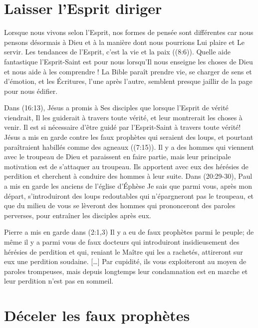 \section{Laisser l'Esprit diriger}

Lorsque nous vivons selon l'Esprit, nos formes de pensée sont différentes
 car nous pensons désormais à Dieu et à la manière dont nous pourrions
 Lui plaire et Le servir.
 Les tendances de l'Esprit, c'est la vie et la paix ((8:6)).
 Quelle aide fantastique l'Esprit-Saint est pour nous lorsqu'Il nous enseigne
 les choses de Dieu et nous aide à les comprendre !
 La Bible paraît prendre vie, se charger de sens et d'émotion,
 et les Écritures, l'une après l'autre, semblent presque jaillir
 de la page pour nous édifier.

Dans (16:13), Jésus a promis à Ses disciples
 que lorsque l'Esprit de vérité viendrait,
 Il les guiderait à travers toute vérité,
 et leur montrerait les choses à venir.
 Il est si nécessaire d'être guidé par l'Esprit-Saint
 à travers toute vérité!
 Jésus a mis en garde contre les faux prophètes qui seraient des loups,
 et pourtant paraîtraient habillés comme des agneaux ((7:15)).
 Il y a des hommes qui viennent avec le troupeau de Dieu
 et paraissent en faire partie, mais leur principale motivation
 est de s'attaquer au troupeau.
 Ils apportent avec eux des hérésies de perdition
 et cherchent à conduire des hommes à leur suite.
 Dans (20:29-30),
 Paul a mis en garde les anciens de l'église d'Éphèse\frcolon{}
 \Og Je sais que parmi vous, après mon départ,
 s'introduiront des loups redoutables
 qui n'épargneront pas le troupeau,
 et que du milieu de vous se lèveront des hommes
 qui prononceront des paroles perverses,
 pour entraîner les disciples après eux. \Fg{}

Pierre a mis en garde dans (2:1,3)\frcolon{}
 \Og Il y a eu de faux prophètes parmi le peuple;
 de même il y a parmi vous de faux docteurs
 qui introduiront insidieusement des hérésies de perdition et qui,
 reniant le Maître qui les a rachetés,
 attireront sur eux une perdition soudaine. [\dots{}]
 Par cupidité, ils vous exploiteront au moyen de paroles trompeuses,
 mais depuis longtemps leur condamnation est en marche
 et leur perdition n'est pas en sommeil. \Fg{}


\section{D\'eceler les faux proph\`etes}

